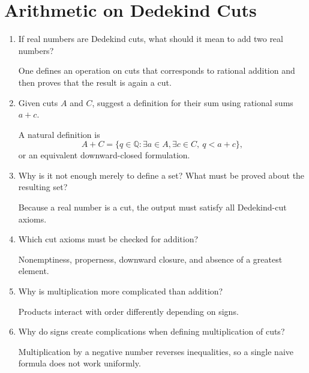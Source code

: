\documentclass{essay}
\begin{document}
\section{Arithmetic on Dedekind Cuts}

\begin{enumerate}[label=\arabic*., itemsep=10pt]

\item If real numbers are Dedekind cuts, what should it mean to add two real numbers?

\begin{answer}
One defines an operation on cuts that corresponds to rational addition and then proves that the result is again a cut.
\end{answer}

\item Given cuts $A$ and $C$, suggest a definition for their sum using rational sums $a+c$.

\begin{answer}
A natural definition is
\[
A+C=\{q\in\mathbb{Q}:\exists a\in A,\exists c\in C,\ q<a+c\},
\]
or an equivalent downward-closed formulation.
\end{answer}

\item Why is it not enough merely to define a set? What must be proved about the resulting set?

\begin{answer}
Because a real number is a cut, the output must satisfy all Dedekind-cut axioms.
\end{answer}

\item Which cut axioms must be checked for addition?

\begin{answer}
Nonemptiness, properness, downward closure, and absence of a greatest element.
\end{answer}

\item Why is multiplication more complicated than addition?

\begin{answer}
Products interact with order differently depending on signs.
\end{answer}

\item Why do signs create complications when defining multiplication of cuts?

\begin{answer}
Multiplication by a negative number reverses inequalities, so a single naive formula does not work uniformly.
\end{answer}


\end{enumerate}
\end{document}
